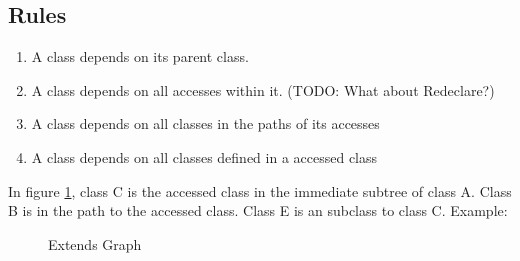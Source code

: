 \documentclass{cslthse-msc}
\begin{document}
\subsection{Rules}
\begin{enumerate}
\item A class depends on its parent class. 
\item A class depends on all accesses within it. (TODO: What about Redeclare?)
\item A class depends on all classes in the paths of its accesses
\item A class depends on all classes defined in a accessed class
\end{enumerate}


In figure \ref{fig:extends}, class C is the accessed class in the immediate subtree of class A. Class B is in the path to the accessed class. Class E is an subclass to class C.
Example:
\begin{figure}[H]
    \centering
    \qquad
    \subfloat{{}}
    \caption{Extends Graph}
    \label{fig:extends}
\end{figure}
\end{document}
